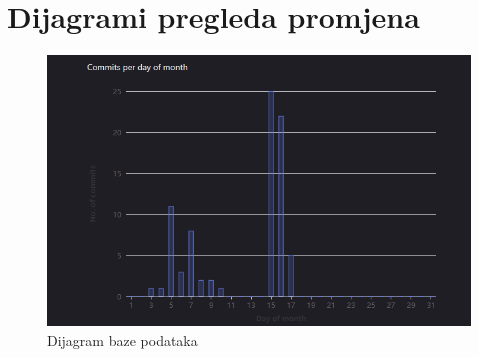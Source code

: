 		\section*{Dijagrami pregleda promjena}
		\begin{figure}[H]
			\includegraphics[scale=0.7]{slike/Aktivnost.png}
			\centering
			\caption{Dijagram baze podataka}
			\label{fig:promjene}
		          \end{figure}
		
		
	